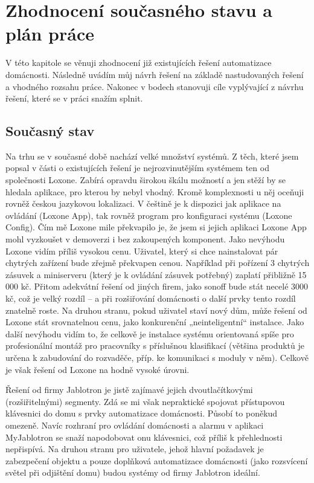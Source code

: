\chapter{Zhodnocení současného stavu a plán práce}
V této kapitole se věnuji zhodnocení již existujících řešení automatizace domácnosti. Následně uvádím můj návrh řešení na základě nastudovaných řešení a vhodného rozsahu práce. Nakonec v bodech stanovuji cíle vyplývající z návrhu řešení, které se v práci snažím splnit.
\section{Současný stav}

Na trhu se v současné době nachází velké množství systémů. Z těch, které jsem popsal v části o existujících řešení je nejrozvinutějším systémem ten od společnosti Loxone. Zabírá opravdu širokou škálu možností a jen stěží by se hledala aplikace, pro kterou by nebyl vhodný. Kromě komplexnosti u něj oceňuji rovněž českou jazykovou lokalizaci. V češtině je k dispozici jak aplikace na ovládání (Loxone App), tak rovněž program pro konfiguraci systému (Loxone Config). Čím mě Loxone mile překvapilo je, že jsem si jejich aplikaci Loxone App mohl vyzkoušet v demoverzi i bez zakoupených komponent.\newline
Jako nevýhodu Loxone vidím příliš vysokou cenu. Uživatel, který si chce nainstalovat pár chytrých zařízení bude zřejmě překvapen cenou. Například při pořízení 3 chytrých zásuvek a miniserveru (který je k ovládání zásuvek potřebný) zaplatí přibližně 15 000 kč. Přitom adekvátní řešení od jiných firem, jako sonoff bude stát necelé 3000 kč, což je velký rozdíl – a při rozšiřování domácnosti o další prvky tento rozdíl znatelně roste. Na druhou stranu, pokud uživatel staví nový dům, může řešení od Loxone stát srovnatelnou cenu, jako konkurenční „neinteligentní“ instalace. Jako další nevýhodu vidím to, že celkově je instalace systému orientovaná spíše pro profesionální montáž pro pracovníky s příslušnou klasifikací (většina produktů je určena k zabudování do rozvaděče, příp. ke komunikaci s moduly v něm). Celkově je však řešení od Loxone na hodně vysoké úrovni.\newline

Řešení od firmy Jablotron je jistě zajímavé jejich dvoutlačítkovými (rozšiřitelnými) segmenty. Zdá se mi však nepraktické spojovat přístupovou klávesnici do domu s prvky automatizace domácnosti. Působí to poněkud omezeně. Navíc rozhraní pro ovládání domácnosti a alarmu v aplikaci MyJablotron se snaží napodobovat onu klávesnici, což příliš k přehlednosti nepřispívá. Na druhou stranu pro uživatele, jehož hlavní požadavek je zabezpečení objektu a pouze doplňková automatizace domácnosti (jako rozsvícení světel při odjištění domu) budou systémy od firmy Jablotron ideální.  \newline

